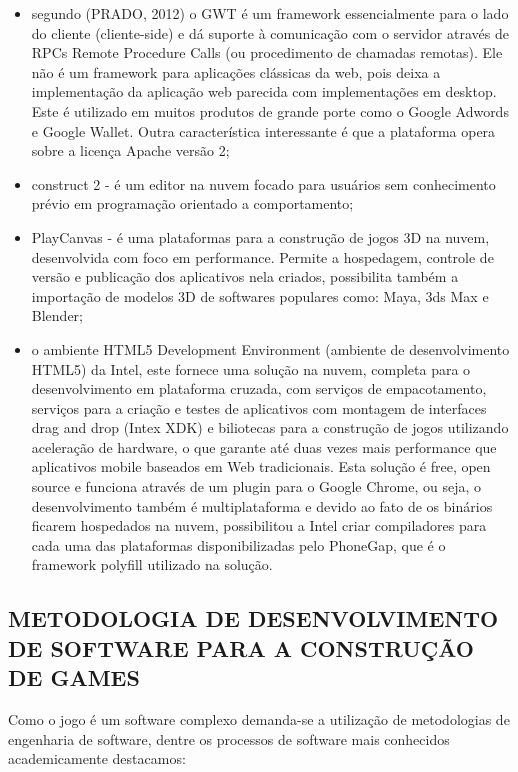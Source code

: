 \documentclass{article}
\begin{document}
\begin{itemize}

    \item segundo (PRADO, 2012) o GWT é um framework essencialmente para o lado do cliente (cliente-side) e dá suporte à comunicação com o servidor através de RPCs Remote Procedure Calls (ou procedimento de chamadas remotas). Ele não é um framework para aplicações clássicas da web, pois deixa a implementação da aplicação web parecida com implementações em desktop. Este é utilizado em muitos produtos de grande porte como o Google Adwords e Google Wallet. Outra característica interessante é que a plataforma opera sobre a licença Apache versão 2;
    \item construct 2 -  é um editor na nuvem focado para usuários sem conhecimento prévio em programação orientado a comportamento;
    \item PlayCanvas - é uma plataformas para a construção de jogos 3D na nuvem, desenvolvida com foco em performance. Permite a hospedagem, controle de versão e publicação dos aplicativos nela criados, possibilita também a importação de modelos 3D de softwares populares como: Maya, 3ds Max e Blender;
    \item o ambiente HTML5 Development Environment (ambiente de desenvolvimento HTML5) da Intel, este fornece uma solução na nuvem, completa para o desenvolvimento em plataforma cruzada, com serviços de empacotamento, serviços para a criação e testes de aplicativos com montagem de interfaces drag and drop (Intex XDK) e biliotecas para a construção de jogos utilizando aceleração de hardware, o que garante até duas vezes mais performance que aplicativos mobile baseados em Web tradicionais. Esta solução é free, open source e funciona  através de um plugin para o Google Chrome, ou seja, o desenvolvimento também é multiplataforma e devido ao fato de os binários ficarem hospedados na nuvem, possibilitou a  Intel criar compiladores para cada uma das plataformas disponibilizadas pelo PhoneGap, que é o framework polyfill utilizado na solução.
\end{itemize}

\subsection{METODOLOGIA DE DESENVOLVIMENTO DE SOFTWARE PARA A CONSTRUÇÃO DE GAMES}

Como o jogo é um software complexo demanda-se a utilização de metodologias de engenharia de software, dentre os processos de software mais conhecidos academicamente destacamos:
\end{document}

